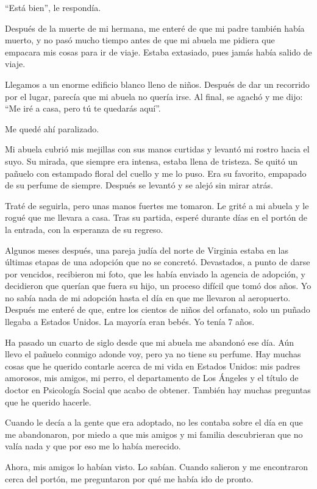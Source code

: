 ``Está bien'', le respondía.

Después de la muerte de mi hermana, me enteré de que mi padre también
había muerto, y no pasó mucho tiempo antes de que mi abuela me pidiera
que empacara mis cosas para ir de viaje. Estaba extasiado, pues jamás
había salido de viaje.

Llegamos a un enorme edificio blanco lleno de niños. Después de dar un
recorrido por el lugar, parecía que mi abuela no quería irse. Al final,
se agachó y me dijo: ``Me iré a casa, pero tú te quedarás aquí''.

Me quedé ahí paralizado.

Mi abuela cubrió mis mejillas con sus manos curtidas y levantó mi rostro
hacia el suyo. Su mirada, que siempre era intensa, estaba llena de
tristeza. Se quitó un pañuelo con estampado floral del cuello y me lo
puso. Era su favorito, empapado de su perfume de siempre. Después se
levantó y se alejó sin mirar atrás.

Traté de seguirla, pero unas manos fuertes me tomaron. Le grité a mi
abuela y le rogué que me llevara a casa. Tras su partida, esperé durante
días en el portón de la entrada, con la esperanza de su regreso.

Algunos meses después, una pareja judía del norte de Virginia estaba en
las últimas etapas de una adopción que no se concretó. Devastados, a
punto de darse por vencidos, recibieron mi foto, que les había enviado
la agencia de adopción, y decidieron que querían que fuera su hijo, un
proceso difícil que tomó dos años. Yo no sabía nada de mi adopción hasta
el día en que me llevaron al aeropuerto. Después me enteré de que, entre
los cientos de niños del orfanato, solo un puñado llegaba a Estados
Unidos. La mayoría eran bebés. Yo tenía 7 años.

Ha pasado un cuarto de siglo desde que mi abuela me abandonó ese día.
Aún llevo el pañuelo conmigo adonde voy, pero ya no tiene su perfume.
Hay muchas cosas que he querido contarle acerca de mi vida en Estados
Unidos: mis padres amorosos, mis amigos, mi perro, el departamento de
Los Ángeles y el título de doctor en Psicología Social que acabo de
obtener. También hay muchas preguntas que he querido hacerle.

Cuando le decía a la gente que era adoptado, no les contaba sobre el día
en que me abandonaron, por miedo a que mis amigos y mi familia
descubrieran que no valía nada y que por eso me lo había merecido.

Ahora, mis amigos lo habían visto. Lo sabían. Cuando salieron y me
encontraron cerca del portón, me preguntaron por qué me había ido de
pronto.

